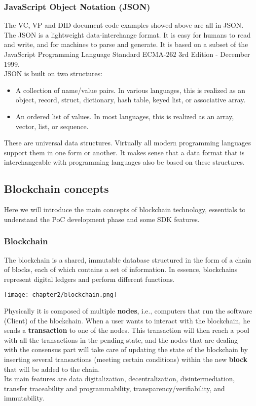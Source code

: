 \subsubsection{JavaScript Object Notation (JSON)}
\label{subsubsec:json}
The VC, VP and DID document code examples showed above are all in JSON.\\
The JSON\cite{site:json} is a lightweight data-interchange format. It is easy for humans to read and 
write, and for machines to parse and generate. It is based on a subset of the JavaScript
Programming Language Standard ECMA-262 3rd Edition - December 1999.\\
JSON is built on two structures:
\begin{itemize}
    \item A collection of name/value pairs. In various languages, this is realized as an 
    object, record, struct, dictionary, hash table, keyed list, or associative array.
    \item An ordered list of values. In most languages, this is realized as an array, 
    vector, list, or sequence.
\end{itemize}
These are universal data structures. Virtually all modern programming languages support 
them in one form or another. It makes sense that a data format that is interchangeable 
with programming languages also be based on these structures.
\subsection{Blockchain concepts}
Here we will introduce the main concepts of blockchain technology, essentials to 
understand the PoC development phase and some SDK features.
\subsubsection{Blockchain}
The blockchain is a shared, immutable database structured in the form of a chain of 
blocks, each of which contains a set of information. In essence, blockchains represent 
digital ledgers and perform different functions.
\begin{center}
    \texttt{[image: chapter2/blockchain.png]}
\end{center}
Physically it is composed of multiple \textbf{nodes}, i.e., computers that run the software 
(Client) of the blockchain. When a user wants to interact with the blockchain, he 
sends a \textbf{transaction} to one of the nodes. This transaction will then reach a pool with 
all the transactions in the pending state, and the nodes that are dealing with the 
consensus part will take care of updating the state of the blockchain by inserting 
several transactions (meeting certain conditions) within the new \textbf{block} that will
be added to the chain.\\
Its main features are data digitalization, decentralization, disintermediation, 
transfer traceability and programmability, transparency/verifiability, and immutability.
